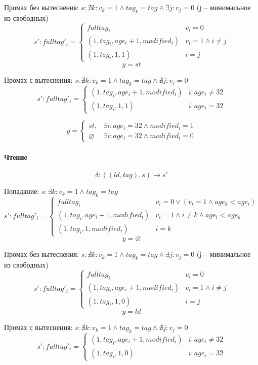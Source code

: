Промах без вытеснения: $s: \nexists k : v_k = 1 \land tag_k = tag \land \exists j: v_j = 0$ (j -- минимальное из свободных)
\[
s':fulltag'_i =
\begin{cases}
	fulltag_i & v_i = 0 \\
	(1,tag_i,age_{i}+1,modified_i) & v_i = 1 \land i \neq j \\
	(1,tag_i,1,1) & i = j
\end{cases}
\]
$$y = st$$

Промах с вытеснения: $s: \nexists k : v_k = 1 \land tag_k = tag \land \nexists j: v_j = 0$
\[
s':fulltag'_i =
\begin{cases}
	(1,tag_i,age_{i}+1,modified_i) & i : age_i \neq 32 \\
	(1,tag_i,1,1) & i : age_i = 32
\end{cases}
\]

\[
y =
\begin{cases}
	st, & \exists i : age_i = 32 \land modified_i = 1 \\
	\varnothing & \exists i : age_i = 32 \land modified_i = 0
\end{cases}
\]

\paragraph*{Чтение}

$$\delta : ((ld,tag),s) \rightarrow s'$$

Попадание: $s: \exists k : v_k = 1 \land tag_k = tag$
\[
s':fulltag'_i =
\begin{cases}
	fulltag_i & v_i = 0 \lor (v_i = 1 \land age_k < age_i)\\
	(1,tag_i,age_{i}+1,modified_i) & v_i = 1 \land i \neq k \land age_i < age_k \\
	(1,tag_i,1,modified_i) & i = k
\end{cases}
\]
$$y = \varnothing$$

Промах без вытеснения: $s: \nexists k : v_k = 1 \land tag_k = tag \land \exists j: v_j = 0$ (j -- минимальное из свободных)
\[
s':fulltag'_i =
\begin{cases}
	fulltag_i & v_i = 0 \\
	(1,tag_i,age_{i}+1,modified_i) & v_i = 1 \land i \neq j \\
	(1,tag_i,1,0) & i = j
\end{cases}
\]
$$y = ld$$

Промах с вытеснения: $s: \nexists k : v_k = 1 \land tag_k = tag \land \nexists j: v_j = 0 $
\[
s':fulltag'_i =
\begin{cases}
	(1,tag_i,age_{i}+1,modified_i) & i : age_i \neq 32 \\
	(1,tag_i,1,0) & i : age_i = 32
\end{cases}
\]


